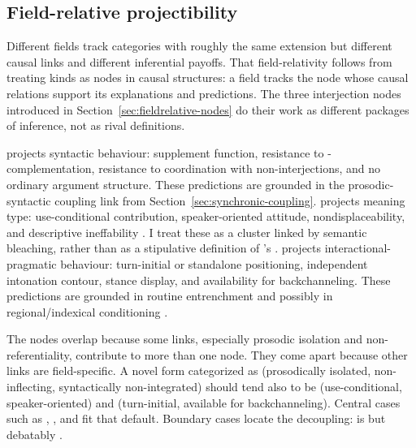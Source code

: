 \documentclass[12pt]{article}
\begin{document}
\subsection{Field-relative projectibility}\label{sec:proj-fieldrelative}

Different fields track categories with roughly the same extension but
different causal links and different inferential payoffs. That
field-relativity follows from treating kinds as nodes in causal
structures: a field tracks the node whose causal relations support its
explanations and predictions.
The three interjection nodes introduced in
Section~\ref{sec:fieldrelative-nodes} do their work as different
packages of inference, not as rival definitions.

 projects syntactic behaviour:
supplement function, resistance to -complementation,
resistance to coordination with non-interjections, and no ordinary
argument structure. These predictions are grounded in the
prosodic-syntactic coupling link from
Section~\ref{sec:synchronic-coupling}. 
projects meaning type: use-conditional contribution,
speaker-oriented attitude, nondisplaceability, and descriptive
ineffability \citep[166]{potts2007}. I treat these as a cluster linked
by semantic bleaching, rather than as a stipulative definition of
\textcite{potts2007}'s . 
projects interactional-pragmatic behaviour: turn-initial or standalone
positioning, independent intonation contour, stance display, and
availability for backchanneling. These predictions are grounded in
routine entrenchment and possibly in regional/indexical conditioning
\citep{stivers2019,dingemanse2020}.

The nodes overlap because some links, especially prosodic isolation
and non-referentiality, contribute to more than one node. They come
apart because other links are field-specific. A novel form categorized
as  (prosodically isolated,
non-inflecting, syntactically non-integrated) should tend also to be
 (use-conditional, speaker-oriented)
and  (turn-initial, available for
backchanneling). Central cases such as , ,
and  fit that default. Boundary cases locate the
decoupling:  is  but
debatably  \citep{oconnell2005}.
\end{document}
